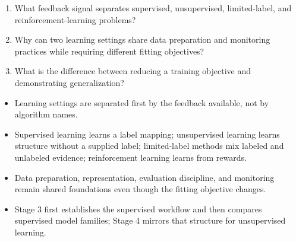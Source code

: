 \begin{quickcheck}
\begin{enumerate}
  \item What feedback signal separates supervised, unsupervised, limited-label, and reinforcement-learning problems?
  \item Why can two learning settings share data preparation and monitoring practices while requiring different fitting objectives?
  \item What is the difference between reducing a training objective and demonstrating generalization?
\end{enumerate}
\end{quickcheck}

\begin{chapterrecap}
\begin{itemize}
  \item Learning settings are separated first by the feedback available, not by algorithm names.
  \item Supervised learning learns a label mapping; unsupervised learning learns structure without a supplied label; limited-label methods mix labeled and unlabeled evidence; reinforcement learning learns from rewards.
  \item Data preparation, representation, evaluation discipline, and monitoring remain shared foundations even though the fitting objective changes.
  \item Stage 3 first establishes the supervised workflow and then compares supervised model families; Stage 4 mirrors that structure for unsupervised learning.
\end{itemize}
\end{chapterrecap}
